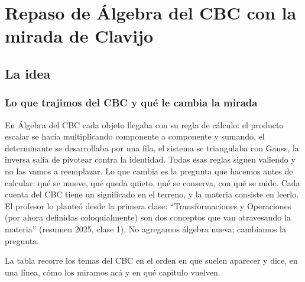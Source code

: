 \chapter{Repaso de Álgebra del CBC con la mirada de Clavijo}\label{cap:03}

\section{La idea}

\subsection{Lo que trajimos del CBC y qué le cambia la mirada}\label{sec:cbc-mirada}

En Álgebra del CBC cada objeto llegaba con su regla de cálculo: el producto escalar se
hacía multiplicando componente a componente y sumando, el determinante se desarrollaba por
una fila, el sistema se triangulaba con Gauss, la inversa salía de pivotear contra la
identidad. Todas esas reglas siguen valiendo y no las vamos a reemplazar. Lo que cambia es
la pregunta que hacemos antes de calcular: qué se mueve, qué queda quieto, qué se conserva,
con qué se mide. Cada cuenta del CBC tiene un significado en el terreno, y la materia
consiste en leerlo. El profesor lo planteó desde la primera clase: ``Transformaciones y
Operaciones (por ahora definidas coloquialmente) son dos conceptos que van atravesando la
materia'' (resumen 2025, clase 1). No agregamos álgebra nueva; cambiamos la pregunta.

La tabla recorre los temas del CBC en el orden en que suelen aparecer y dice, en una línea,
cómo los miramos acá y en qué capítulo vuelven.


